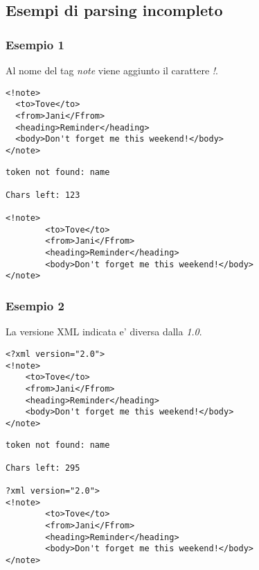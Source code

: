 \documentclass[italian,a4paper]{article}
\begin{document}
\subsection{Esempi di parsing incompleto}

\subsubsection{Esempio 1}

Al nome del tag \emph{note} viene aggiunto il carattere \emph{!}.

\begin{mdframed}[frametitle=Input]
\begin{verbatim}
<!note>
  <to>Tove</to>
  <from>Jani</Ffrom>
  <heading>Reminder</heading>
  <body>Don't forget me this weekend!</body>
</note>
\end{verbatim}
\end{mdframed}

\begin{mdframed}[frametitle=Output]
\begin{verbatim}
token not found: name

Chars left: 123

<!note>
        <to>Tove</to>
        <from>Jani</Ffrom>
        <heading>Reminder</heading>
        <body>Don't forget me this weekend!</body>
</note>
\end{verbatim}
\end{mdframed}

\subsubsection{Esempio 2}

La versione XML indicata e' diversa dalla \emph{1.0}.

\begin{mdframed}[frametitle=Input]
\begin{verbatim}
<?xml version="2.0">
<!note>
	<to>Tove</to>
	<from>Jani</Ffrom>
	<heading>Reminder</heading>
	<body>Don't forget me this weekend!</body>
</note>
\end{verbatim}
\end{mdframed}

\begin{mdframed}[frametitle=Output]
\begin{verbatim}
token not found: name

Chars left: 295

?xml version="2.0">
<!note>                                                   
        <to>Tove</to>                                     
        <from>Jani</Ffrom>                                
        <heading>Reminder</heading>                       
        <body>Don't forget me this weekend!</body>        
</note>
\end{verbatim}
\end{mdframed}
\end{document}
